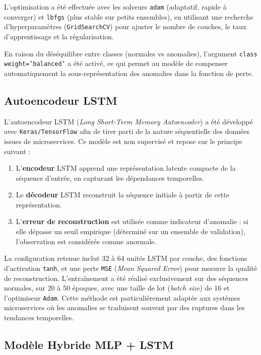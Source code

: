 \documentclass[a4paper,12pt]{report}
\begin{document}
L’optimisation a été effectuée avec les solveurs \texttt{adam} (adaptatif, rapide à converger) et \texttt{lbfgs} (plus stable sur petits ensembles), en utilisant une recherche d’hyperparamètres (\texttt{GridSearchCV}) pour ajuster le nombre de couches, le taux d’apprentissage et la régularisation.

En raison du déséquilibre entre classes (normales vs anomalies), l’argument \texttt{class weight='balanced'} a été activé, ce qui permet au modèle de compenser automatiquement la sous-représentation des anomalies dans la fonction de perte.

\subsection{Autoencodeur LSTM}

L’autoencodeur LSTM (\textit{Long Short-Term Memory Autoencoder}) a été développé avec \texttt{Keras/TensorFlow} afin de tirer parti de la nature séquentielle des données issues de microservices. Ce modèle est non supervisé et repose sur le principe suivant :
\begin{enumerate}
    \item L’\textbf{encodeur} LSTM apprend une représentation latente compacte de la séquence d’entrée, en capturant les dépendances temporelles.
    \item Le \textbf{décodeur} LSTM reconstruit la séquence initiale à partir de cette représentation.
    \item L’\textbf{erreur de reconstruction} est utilisée comme indicateur d’anomalie : si elle dépasse un seuil empirique (déterminé sur un ensemble de validation), l’observation est considérée comme anormale.
\end{enumerate}

La configuration retenue inclut 32 à 64 unités LSTM par couche, des fonctions d’activation \texttt{tanh}, et une perte \texttt{MSE} (\textit{Mean Squared Error}) pour mesurer la qualité de reconstruction.  
L’entraînement a été réalisé exclusivement sur des séquences normales, sur 20 à 50 époques, avec une taille de lot (\textit{batch size}) de 16 et l’optimiseur \texttt{Adam}.  
Cette méthode est particulièrement adaptée aux systèmes microservices où les anomalies se traduisent souvent par des ruptures dans les tendances temporelles.

\subsection{Modèle Hybride MLP + LSTM}
\end{document}
